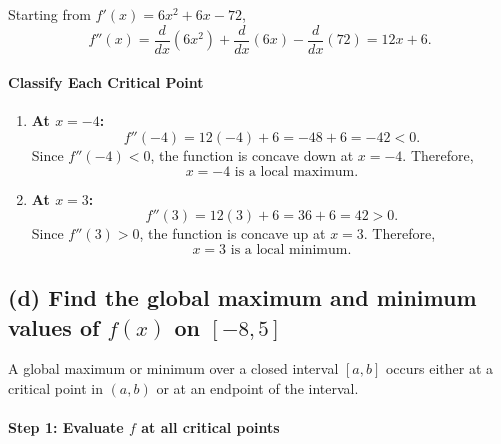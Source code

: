 \documentclass[12pt]{article}
\begin{document}
Starting from \(f'(x) = 6x^2 + 6x - 72\),
\[
\boxed{
f''(x) = \frac{d}{dx}(6x^2) + \frac{d}{dx}(6x) - \frac{d}{dx}(72) 
        = 12x + 6.
}
\]

\paragraph{Classify Each Critical Point}

\begin{enumerate}
    \item \textbf{At \(x = -4\):}  
    \[
    f''(-4) = 12(-4) + 6 = -48 + 6 = -42 < 0.
    \]
    Since \(f''(-4) < 0\), the function is concave down at \(x = -4\). Therefore,
    \[
    \boxed{x = -4 \text{ is a local maximum.}}
    \]
    
    \item \textbf{At \(x = 3\):}  
    \[
    f''(3) = 12(3) + 6 = 36 + 6 = 42 > 0.
    \]
    Since \(f''(3) > 0\), the function is concave up at \(x = 3\). Therefore,
    \[
    \boxed{x = 3 \text{ is a local minimum.}}
    \]
\end{enumerate}
\newpage
\subsection*{(d) Find the global maximum and minimum values of \( f(x) \) on \([-8, 5]\)}

A global maximum or minimum over a closed interval \([a, b]\) occurs either at a critical point in \((a, b)\) or at an endpoint of the interval.

\paragraph{Step 1: Evaluate \(f\) at all critical points}
\end{document}
